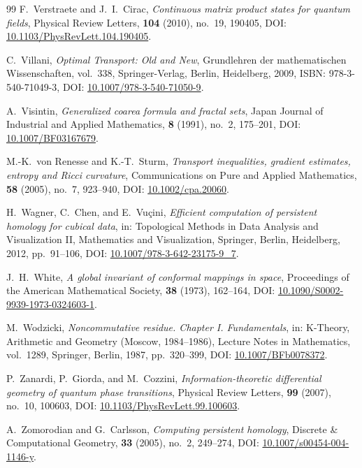 \documentclass[11pt,a4paper,reqno]{amsart}
\theoremstyle{definition}
\numberwithin{equation}{section}
\begin{document}
\begin{thebibliography}{99}
F.~Verstraete and J.~I.~Cirac,
\emph{Continuous matrix product states for quantum fields},
Physical Review Letters, \textbf{104} (2010), no.~19, 190405, DOI: \href{https://doi.org/10.1103/PhysRevLett.104.190405}{10.1103/PhysRevLett.104.190405}.

C.~Villani,
\emph{Optimal Transport: Old and New},
Grundlehren der mathematischen Wissenschaften, vol.~338, Springer-Verlag, Berlin, Heidelberg, 2009, ISBN: 978-3-540-71049-3, DOI: \href{https://doi.org/10.1007/978-3-540-71050-9}{10.1007/978-3-540-71050-9}.

A.~Visintin,
\emph{Generalized coarea formula and fractal sets},
Japan Journal of Industrial and Applied Mathematics, \textbf{8} (1991), no.~2, 175--201, DOI: \href{https://doi.org/10.1007/BF03167679}{10.1007/BF03167679}.

M.-K.~von Renesse and K.-T.~Sturm,
\emph{Transport inequalities, gradient estimates, entropy and Ricci curvature},
Communications on Pure and Applied Mathematics, \textbf{58} (2005), no.~7, 923--940, DOI: \href{https://doi.org/10.1002/cpa.20060}{10.1002/cpa.20060}.

H.~Wagner, C.~Chen, and E.~Vu{\c{c}}ini,
\emph{Efficient computation of persistent homology for cubical data},
in: Topological Methods in Data Analysis and Visualization II, Mathematics and Visualization, Springer, Berlin, Heidelberg, 2012, pp.~91--106, DOI: \href{https://doi.org/10.1007/978-3-642-23175-9_7}{10.1007/978-3-642-23175-9\_7}.

J.~H.~White,
\emph{A global invariant of conformal mappings in space},
Proceedings of the American Mathematical Society, \textbf{38} (1973), 162--164, DOI: \href{https://doi.org/10.1090/S0002-9939-1973-0324603-1}{10.1090/S0002-9939-1973-0324603-1}.

M.~Wodzicki,
\emph{Noncommutative residue. Chapter I. Fundamentals},
in: K-Theory, Arithmetic and Geometry (Moscow, 1984--1986), Lecture Notes in Mathematics, vol.~1289, Springer, Berlin, 1987, pp.~320--399, DOI: \href{https://doi.org/10.1007/BFb0078372}{10.1007/BFb0078372}.

P.~Zanardi, P.~Giorda, and M.~Cozzini,
\emph{Information-theoretic differential geometry of quantum phase transitions},
Physical Review Letters, \textbf{99} (2007), no.~10, 100603, DOI: \href{https://doi.org/10.1103/PhysRevLett.99.100603}{10.1103/PhysRevLett.99.100603}.

A.~Zomorodian and G.~Carlsson,
\emph{Computing persistent homology},
Discrete \& Computational Geometry, \textbf{33} (2005), no.~2, 249--274, DOI: \href{https://doi.org/10.1007/s00454-004-1146-y}{10.1007/s00454-004-1146-y}.

\end{thebibliography}
\end{document}
